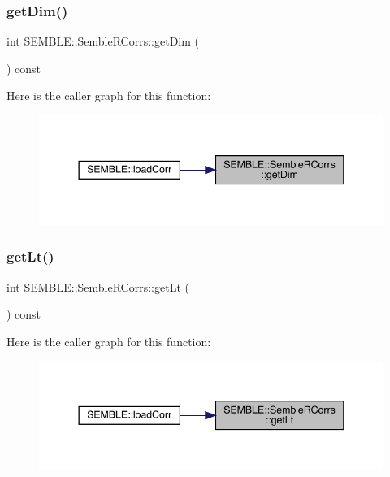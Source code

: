 \subsubsection{\texorpdfstring{getDim()}{getDim()}}
{\footnotesize\ttfamily int S\+E\+M\+B\+L\+E\+::\+Semble\+R\+Corrs\+::get\+Dim (\begin{DoxyParamCaption}{ }\end{DoxyParamCaption}) const}

Here is the caller graph for this function\+:
\nopagebreak
\begin{figure}[H]
\begin{center}
\leavevmode
\includegraphics[width=344pt]{d4/d78/classSEMBLE_1_1SembleRCorrs_a30b37ab8e6c87236d82e32e224418c54_icgraph}
\end{center}
\end{figure}
\mbox{\label{classSEMBLE_1_1SembleRCorrs_a613916dc6047b732aabfffb6dcfe03c5}} 
\subsubsection{\texorpdfstring{getLt()}{getLt()}}
{\footnotesize\ttfamily int S\+E\+M\+B\+L\+E\+::\+Semble\+R\+Corrs\+::get\+Lt (\begin{DoxyParamCaption}{ }\end{DoxyParamCaption}) const}

Here is the caller graph for this function\+:
\nopagebreak
\begin{figure}[H]
\begin{center}
\leavevmode
\includegraphics[width=344pt]{d4/d78/classSEMBLE_1_1SembleRCorrs_a613916dc6047b732aabfffb6dcfe03c5_icgraph}
\end{center}
\end{figure}
\mbox{\label{classSEMBLE_1_1SembleRCorrs_a1695e747d8b6469c3bcf538cea18500b}} 
